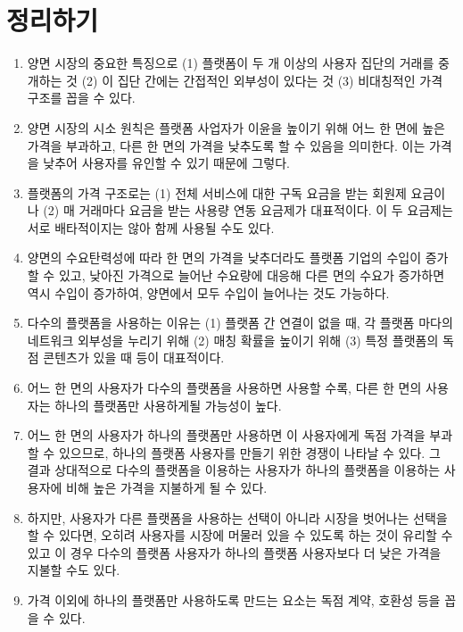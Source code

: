 \pagebreak

\section*{정리하기}
\begin{enumerate}
\item 양면 시장의 중요한 특징으로 (1) 플랫폼이 두 개 이상의 사용자 집단의 거래를 중개하는 것 (2) 이 집단 간에는 간접적인 외부성이 있다는 것 (3) 비대칭적인 가격 구조를 꼽을 수 있다.
\item 양면 시장의 시소 원칙은 플랫폼 사업자가 이윤을 높이기 위해 어느 한 면에 높은 가격을 부과하고, 다른 한 면의 가격을 낮추도록 할 수 있음을 의미한다. 이는 가격을 낮추어 사용자를 유인할 수 있기 때문에 그렇다.
\item 플랫폼의 가격 구조로는 (1) 전체 서비스에 대한 구독 요금을 받는 회원제 요금이나 (2) 매 거래마다 요금을 받는 사용량 연동 요금제가 대표적이다. 이 두 요금제는 서로 배타적이지는 않아 함께 사용될 수도 있다.
\item 양면의 수요탄력성에 따라 한 면의 가격을 낮추더라도 플랫폼 기업의 수입이 증가할 수 있고, 낮아진 가격으로 늘어난 수요량에 대응해 다른 면의 수요가 증가하면 역시 수입이 증가하여, 양면에서 모두 수입이 늘어나는 것도 가능하다.
\item 다수의 플랫폼을 사용하는 이유는 (1) 플랫폼 간 연결이 없을 때, 각 플랫폼 마다의 네트워크 외부성을 누리기 위해 (2) 매칭 확률을 높이기 위해 (3) 특정 플랫폼의 독점 콘텐츠가 있을 때 등이 대표적이다.
\item 어느 한 면의 사용자가 다수의 플랫폼을 사용하면 사용할 수록, 다른 한 면의 사용자는 하나의 플랫폼만 사용하게될 가능성이 높다.
\item 어느 한 면의 사용자가 하나의 플랫폼만 사용하면 이 사용자에게 독점 가격을 부과할 수 있으므로, 하나의 플랫폼 사용자를 만들기 위한 경쟁이 나타날 수 있다. 그 결과 상대적으로 다수의 플랫폼을 이용하는 사용자가 하나의 플랫폼을 이용하는 사용자에 비해 높은 가격을 지불하게 될 수 있다.
\item 하지만, 사용자가 다른 플랫폼을 사용하는 선택이 아니라 시장을 벗어나는 선택을 할 수 있다면, 오히려 사용자를 시장에 머물러 있을 수 있도록 하는 것이 유리할 수 있고 이 경우 다수의 플랫폼 사용자가 하나의 플랫폼 사용자보다 더 낮은 가격을 지불할 수도 있다.
\item 가격 이외에 하나의 플랫폼만 사용하도록 만드는 요소는 독점 계약, 호환성 등을 꼽을 수 있다.
\end{enumerate}

